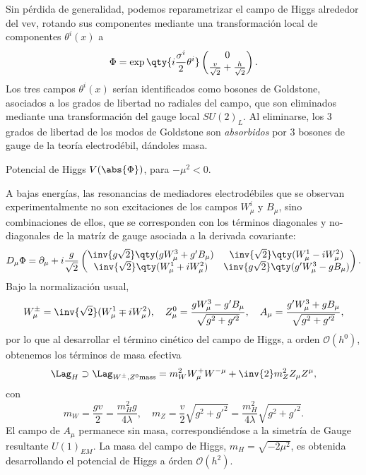 Sin pérdida de generalidad, podemos reparametrizar el campo de Higgs alrededor del vev, rotando sus componentes mediante una transformación local de componentes $\theta^i(x)$ a
\[ \Phi = \exp\qty{i \frac{\sigma^i}{2} \theta^i} \begin{pmatrix} 0 \\ \frac{v}{\sqrt{2}} + \frac{h}{\sqrt{2}} \end{pmatrix}. \]
Los tres campos $\theta^i(x)$ serían identificados como bosones de Goldstone, asociados a los grados de libertad no radiales del campo, que son eliminados mediante una transformación del gauge local $SU(2)_L$. Al eliminarse, los 3 grados de libertad de los modos de Goldstone son \textit{absorbidos} por 3 bosones de gauge de la teoría electrodébil, dándoles masa.

\begin{marginfigure}[-20em]
  \centering
  
  \caption{Potencial de Higgs $V(\abs{\Phi})$, para $-\mu^2 < 0$.}
  \label{fig:ch1:SM:Higgs_potential}
\end{marginfigure}

A bajas energías, las resonancias de mediadores electrodébiles que se observan experimentalmente no son excitaciones de los campos $W^i_\mu$ y $B_\mu$, sino combinaciones de ellos, que se corresponden con los términos diagonales y no-diagonales de la matríz de gauge asociada a la derivada covariante:
\[
  D_\mu \Phi = \partial_\mu + i \frac{g}{\sqrt{2}}
  \begin{pmatrix}
    \inv{g\sqrt{2}}\qty(g W^3_\mu + g' B_\mu) & \inv{\sqrt{2}} \qty(W^1_\mu - i W^2_\mu)  \\
    \inv{\sqrt{2}} \qty(W^1_\mu + i W^2_\mu)  & \inv{g\sqrt{2}}\qty(g' W^3_\mu - g B_\mu)
  \end{pmatrix}.
\]
Bajo la normalización usual,
\[ 
  W^\pm_\mu = \inv{\sqrt{2}}(W^1_\mu \mp i W^2_\mu), 
  \quad 
  Z^0_\mu = \frac{g W^3_\mu - g' B_\mu}{\sqrt{g^2+g'^2}},
  \quad
  A_\mu = \frac{g' W^3_\mu + g B_\mu}{\sqrt{g^2+g'^2}},
\]
por lo que al desarrollar el término cinético del campo de Higgs, a orden $\mathcal{O}(h^0)$, obtenemos los términos de masa efectiva
\[ \Lag_{H} \supset \Lag_{W^\pm, Z^0 \text{mass}} = m_W^2 W^+_\mu W^{-\mu} + \inv{2} m_Z^2 Z_\mu Z^\mu, \]
con
\[ m_W = \frac{gv}{2} = \frac{m_H^2 g}{4\lambda}, \quad m_Z = \frac{v}{2}\sqrt{g^2 + g'^2} = \frac{m_H^2}{4\lambda} \sqrt{g^2 + g'^2}. \]
El campo de $A_\mu$ permanece sin masa, correspondiéndose a la simetría de Gauge resultante $U(1)_{EM}$. La masa del campo de Higgs, $m_H = \sqrt{-2\mu^2}$, es obtenida desarrollando el potencial de Higgs a órden $\mathcal{O}(h^2)$.

